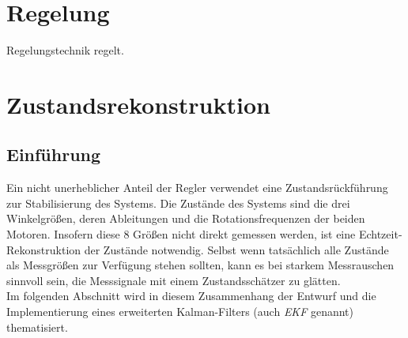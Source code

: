 \documentclass[times, 10pt,twocolumn]{article}
\begin{document}
	
	\section{Regelung}
	Regelungstechnik regelt. 
	
	\newpage
	\section{Zustandsrekonstruktion}
	\subsection{Einf\"uhrung}
	Ein nicht unerheblicher Anteil der Regler verwendet eine Zustandsr\"uckf\"uhrung zur Stabilisierung des Systems. Die Zust\"ande des Systems sind die drei Winkelgr\"oßen, deren Ableitungen und die Rotationsfrequenzen der beiden Motoren. Insofern diese 8 Gr\"oßen nicht direkt gemessen werden, ist eine Echtzeit-Rekonstruktion der Zustände notwendig. 
	Selbst wenn tatsächlich alle Zustände als Messgrößen zur Verfügung stehen sollten, kann es bei starkem Messrauschen sinnvoll sein, die Messsignale mit einem Zustandsschätzer zu glätten. \\
	Im folgenden Abschnitt wird in diesem Zusammenhang der Entwurf und die Implementierung eines erweiterten Kalman-Filters (auch \textit{EKF} genannt)  thematisiert. 
\end{document}
